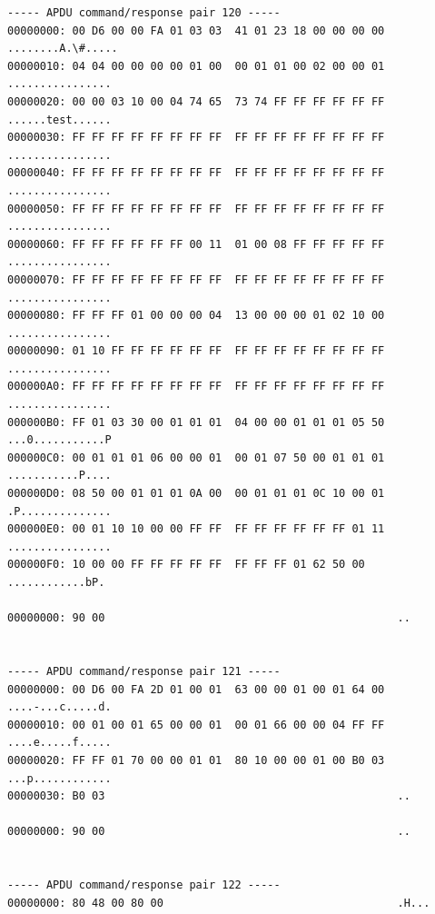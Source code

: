 \documentclass[bsc,frontabs,twoside,singlespacing,parskip,deptreport]{infthesis}     %
\begin{document}
\begin{appendices}
\begin{Verbatim}[commandchars=\\\{\}, fontsize=\small]
----- APDU command/response pair 120 -----
00000000: 00 D6 00 00 FA 01 03 03  41 01 23 18 00 00 00 00  ........A.\#.....
00000010: 04 04 00 00 00 00 01 00  00 01 01 00 02 00 00 01  ................
00000020: 00 00 03 10 00 04 74 65  73 74 FF FF FF FF FF FF  ......test......
00000030: FF FF FF FF FF FF FF FF  FF FF FF FF FF FF FF FF  ................
00000040: FF FF FF FF FF FF FF FF  FF FF FF FF FF FF FF FF  ................
00000050: FF FF FF FF FF FF FF FF  FF FF FF FF FF FF FF FF  ................
00000060: FF FF FF FF FF FF 00 11  01 00 08 FF FF FF FF FF  ................
00000070: FF FF FF FF FF FF FF FF  FF FF FF FF FF FF FF FF  ................
00000080: FF FF FF 01 00 00 00 04  13 00 00 00 01 02 10 00  ................
00000090: 01 10 FF FF FF FF FF FF  FF FF FF FF FF FF FF FF  ................
000000A0: FF FF FF FF FF FF FF FF  FF FF FF FF FF FF FF FF  ................
000000B0: FF 01 03 30 00 01 01 01  04 00 00 01 01 01 05 50  ...0...........P
000000C0: 00 01 01 01 06 00 00 01  00 01 07 50 00 01 01 01  ...........P....
000000D0: 08 50 00 01 01 01 0A 00  00 01 01 01 0C 10 00 01  .P..............
000000E0: 00 01 10 10 00 00 FF FF  FF FF FF FF FF FF 01 11  ................
000000F0: 10 00 00 FF FF FF FF FF  FF FF FF 01 62 50 00     ............bP.

00000000: 90 00                                             ..


----- APDU command/response pair 121 -----
00000000: 00 D6 00 FA 2D 01 00 01  63 00 00 01 00 01 64 00  ....-...c.....d.
00000010: 00 01 00 01 65 00 00 01  00 01 66 00 00 04 FF FF  ....e.....f.....
00000020: FF FF 01 70 00 00 01 01  80 10 00 00 01 00 B0 03  ...p............
00000030: B0 03                                             ..

00000000: 90 00                                             ..


----- APDU command/response pair 122 -----
00000000: 80 48 00 80 00                                    .H...


\end{Verbatim}
\end{appendices}
\end{document}
